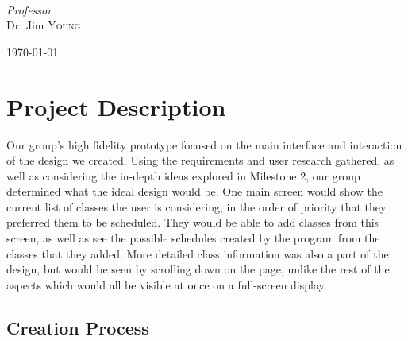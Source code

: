 \documentclass{article}
\begin{document}
\begin{titlepage}
\begin{minipage}{0.4\textwidth}
\begin{flushleft}
		\end{flushleft}
	\end{minipage}
	~
	\begin{minipage}{0.4\textwidth}
		\begin{flushright}
			\large
			\textit{Professor}\\
			Dr. Jim \textsc{Young} %
		\end{flushright}
	\end{minipage}

	
	\vfill\vfill\vfill %
	
	{\large\today} %

	\vfill %
	
\end{titlepage}
\newpage


\section{Project Description}
Our group's high fidelity prototype focused on the main interface and interaction of the design we created. Using the requirements and user research gathered, as well as considering the in-depth ideas explored in Milestone 2, our group determined what the ideal design would be. One main screen would show the current list of classes the user is considering, in the order of priority that they preferred them to be scheduled. They would be able to add classes from this screen, as well as see the possible schedules created by the program from the classes that they added. More detailed class information was also a part of the design, but would be seen by scrolling down on the page, unlike the rest of the aspects which would all be visible at once on a full-screen display.

\subsection{Creation Process}
\end{document}
